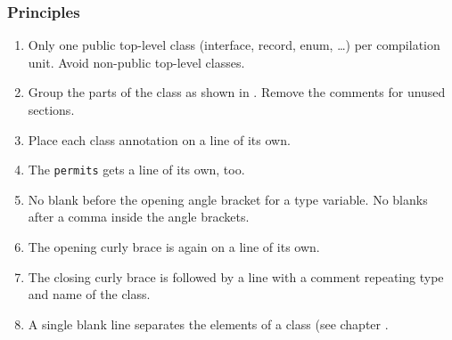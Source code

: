 \subsubsection{Principles}
\begin{enumerate}[label=P\arabic*.]
\item{Only one public top-level class (interface, record, enum, …) per compilation unit. Avoid non-public top-level classes.}
\item{Group the parts of the class as shown in . Remove the comments for unused sections.}
\item{Place each class annotation on a line of its own.}
\item{The \lstinline|permits| gets a line of its own, too.}
\item{No blank before the opening angle bracket for a type variable. No blanks after a comma inside the angle brackets.}
\item{The opening curly brace is again on a line of its own.}
\item{The closing curly brace is followed by a line with a comment repeating type and name of the class.}
\item{A single blank line separates the elements of a class (see chapter .}
\end{enumerate}


